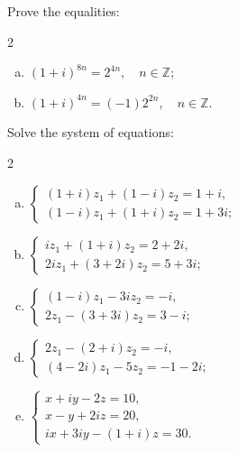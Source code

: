 \begin{problem}
Prove the equalities:
\begin{multicols}{2}
\begin{enumerate}[a)]
    \item $(1+i)^{8n} = 2^{4n}, \quad n \in \mathbb{Z}$;
    \item $(1+i)^{4n} = (-1)2^{2n}, \quad n \in \mathbb{Z}$. 
\end{enumerate} 
\end{multicols}
\end{problem}

\begin{problem}
Solve the system of equations:
\begin{multicols}{2}
\begin{enumerate}[a) ]
\item $\left\{\begin{array}{l}(1+i) z_1+(1-i) z_2=1+i, \\ (1-i) z_1+(1+i) z_2=1+3 i;\end{array}\right.$ 

\item $\left\{\begin{array}{l}i z_1+(1+i) z_2=2+2 i,\\ 2 i z_1+(3+2 i) z_2=5+3 i;\end{array}\right.$

\item $\left\{\begin{array}{l}(1-i) z_1-3i z_2=-i, \\ 2z_1-(3+3i)z_2=3-i;\end{array}\right.$

\item $\left\{\begin{array}{l}2 z_1-(2+i) z_2=-i, \\ (4-2 i) z_1-5 z_2=-1-2 i ;\end{array} \quad\right.$ 

\item $\left\{\begin{array}{l}x+i y-2 z=10, \\ x-y+2 i z=20, \\ i x+3 i y-(1+i) z=30.\end{array}\right.$
\end{enumerate}
\end{multicols}
\end{problem}  

